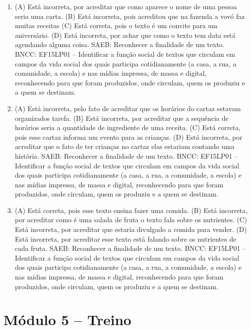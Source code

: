 \begin{enumerate}
\item
(A) Está incorreta, por acreditar que como aparece o nome de uma pessoa seria uma carta.
(B) Está incorreta, pois acreditou que na fazenda a vovó faz muitas receitas
(C) Está correta, pois o texto é um convite para um aniversário.
(D) Está incorreta, por achar que como o texto tem data está agendando alguma coisa.
SAEB: Reconhecer a finalidade de um texto.
BNCC: EF15LP01 -- Identificar a função social de textos que
circulam em campos da vida social dos quais participa cotidianamente (a
casa, a rua, a comunidade, a escola) e nas mídias impressa, de massa e
digital, reconhecendo para que foram produzidos, onde circulam, quem os
produziu e a quem se destinam.

\item
(A) Está incorreta, pelo fato de acreditar que os horários do cartaz
estavam organizados tarefa.
(B) Está incorreta, por acreditar que a sequência de horários seria a
quantidade de ingrediente de uma receita.
(C) Está correta, pois esse cartaz informa um evento para as crianças.
(D) Está incorreta, por acreditar que o fato de ter crianças no cartaz
elas estariam contando uma história.
SAEB: Reconhecer a finalidade de um texto.
BNCC: EF15LP01 -- Identificar a função social de textos que
circulam em campos da vida social dos quais participa cotidianamente (a
casa, a rua, a comunidade, a escola) e nas mídias impressa, de massa e
digital, reconhecendo para que foram produzidos, onde circulam, quem os
produziu e a quem se destinam.

\item
(A) Está correta, pois esse texto ensina fazer uma comida.
(B) Está incorreta, por acreditar como é uma salada de fruta o texto fala sobre os nutrientes.
(C) Está incorreta, por acreditar que estaria divulgado a comida para vender.
(D) Está incorreta, por acreditar esse texto está falando sobre os
nutrientes de cada fruta.
SAEB: Reconhecer a finalidade de um texto.
BNCC: EF15LP01 -- Identificar a função social de textos que
circulam em campos da vida social dos quais participa cotidianamente (a
casa, a rua, a comunidade, a escola) e nas mídias impressa, de massa e
digital, reconhecendo para que foram produzidos, onde circulam, quem os
produziu e a quem se destinam.
\end{enumerate}

\section*{Módulo 5 – Treino}

